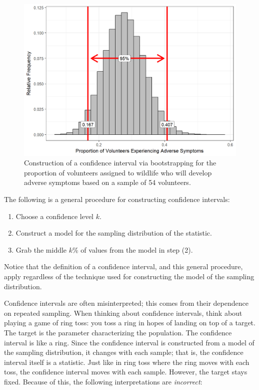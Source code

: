 \documentclass[]{book}
\providecommand{\tightlist}{%
  \setlength{\itemsep}{0pt}\setlength{\parskip}{0pt}}
\theoremstyle{plain}
\theoremstyle{mydefn}
\theoremstyle{myexmpl}
\theoremstyle{remark}
\let\BeginKnitrBlock\begin \let\EndKnitrBlock\end
\let\BeginKnitrBlock\begin \let\EndKnitrBlock\end
\begin{document}
\begin{figure}

{\centering \includegraphics[width=0.8\linewidth]{./Images/samplingdistns-deepwater-ci-1} 

}

\caption{Construction of a confidence interval via bootstrapping for the proportion of volunteers assigned to wildlife who will develop adverse symptoms based on a sample of 54 volunteers.}\label{fig:samplingdistns-deepwater-ci}
\end{figure}

\BeginKnitrBlock{rmdtip}
The following is a general procedure for constructing confidence
intervals:

\begin{enumerate}
\def\labelenumi{\arabic{enumi}.}
\tightlist
\item
  Choose a confidence level \(k\).
\item
  Construct a model for the sampling distribution of the statistic.
\item
  Grab the middle \(k\)\% of values from the model in step (2).
\end{enumerate}

Notice that the definition of a confidence interval, and this general
procedure, apply regardless of the technique used for constructing the
model of the sampling distribution.
\EndKnitrBlock{rmdtip}

Confidence intervals are often misinterpreted; this comes from their
dependence on repeated sampling. When thinking about confidence
intervals, think about playing a game of ring toss: you toss a ring in
hopes of landing on top of a target. The target is the parameter
characterizing the population. The confidence interval is like a ring.
Since the confidence interval is constructed from a model of the
sampling distribution, it changes with each sample; that is, the
confidence interval itself is a statistic. Just like in ring toss where
the ring moves with each toss, the confidence interval moves with each
sample. However, the target stays fixed. Because of this, the following
interpretations are \emph{incorrect}:
\end{document}
